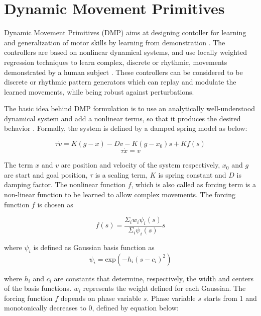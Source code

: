 \documentclass[sigconf]{acmart}
\begin{document}
\section{Dynamic Movement Primitives}
\label{sec:dmp}
Dynamic Movement Primitives (DMP) aims at designing contoller for learning and generalization of motor skills by learning from demonstration \cite{ijspeert2003learning}. The controllers are based on nonlinear dynamical systems, and use locally weighted regression techniques to learn complex, discrete or rhythmic, movements demonstrated by a human subject \cite{ijspeert2002movement}. These controllers can be considered to be discrete or rhythmic pattern generators which can replay and modulate the learned movements, while being robust against perturbations.

The basic idea behind DMP formulation is to use an analytically well-understood dynamical system and add a nonlinear terms, so that it produces the desired behavior \cite{ijspeert2013dynamical}. Formally, the system is defined by a damped spring model as below:

\begin{equation}
	\tau	 \dot{v} = K (g - x) -D v - K (g - x_0) s + K f(s)
\end{equation}
\begin{equation}
	\tau	 \dot{x} = v
\end{equation}

The term $x$ and $v$ are position and velocity of the system respectively, $x_0$ and $g$ are start and goal position, $\tau$ is a scaling term, $K$ is spring constant and $D$ is damping factor. The nonlinear function $f$, which is also called as forcing term is a non-linear function to be learned to allow complex movements. The forcing function $f$ is chosen as

\begin{equation}
	f(s) = \frac{\Sigma_{i} w_i \psi_i(s)}{\Sigma_{i} \psi_i(s)} s
	\label{eq:forcing_func}
\end{equation}

where $\psi_i$ is defined as Gaussian basis function as
\begin{equation}
	\psi_i = \textrm{exp}\left( -h_i \left( s - c_i\right)^2 \right)
\end{equation}

where $h_i$ and $c_i$ are constants that determine, respectively, the width and centers of the basis functions. $w_i$ represents the weight defined for each Gaussian. The forcing function $f$ depends on phase variable $s$. Phase variable $s$ starts from 1 and monotonically decreases to 0, defined by equation below:
\end{document}
